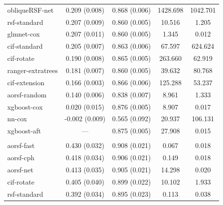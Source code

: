 \documentclass{article}\usepackage[]{graphicx}\usepackage[]{xcolor}
\newenvironment{knitrout}{}{} %
\begin{document}
\begin{knitrout}
\begin{longtable}[t]{lcccc}
\hspace{1em}obliqueRSF-net & 0.209 (0.008) & 0.868 (0.006) & 1428.698 & 1042.701\\
\hspace{1em}rsf-standard & 0.207 (0.009) & 0.860 (0.005) & 10.516 & 1.205\\
\hspace{1em}glmnet-cox & 0.207 (0.011) & 0.860 (0.005) & 1.345 & 0.012\\
\hspace{1em}cif-standard & 0.205 (0.007) & 0.863 (0.006) & 67.597 & 624.624\\
\hspace{1em}cif-rotate & 0.190 (0.008) & 0.865 (0.005) & 263.660 & 62.919\\
\hspace{1em}ranger-extratrees & 0.181 (0.007) & 0.860 (0.005) & 39.632 & 80.768\\
\hspace{1em}cif-extension & 0.166 (0.003) & 0.866 (0.006) & 125.288 & 53.237\\
\hspace{1em}aorsf-random & 0.140 (0.006) & 0.838 (0.007) & 8.961 & 1.333\\
\hspace{1em}xgboost-cox & 0.020 (0.015) & 0.876 (0.005) & 8.907 & 0.017\\
\hspace{1em}nn-cox & -0.002 (0.009) & 0.565 (0.092) & 20.937 & 106.131\\
\hspace{1em}xgboost-aft & --- & 0.875 (0.005) & 27.908 & 0.015\\
\addlinespace[0.3em]
\multicolumn{5}{l}{\textit{\textbf{Primary biliary cholangitis; death, n = 276, p = 19}}}\\
\hline
\hspace{1em}aorsf-fast & 0.430 (0.032) & 0.908 (0.021) & 0.067 & 0.018\\
\hspace{1em}aorsf-cph & 0.418 (0.034) & 0.906 (0.021) & 0.149 & 0.018\\
\hspace{1em}aorsf-net & 0.413 (0.035) & 0.905 (0.021) & 14.298 & 0.020\\
\hspace{1em}cif-rotate & 0.405 (0.040) & 0.899 (0.022) & 10.102 & 1.933\\
\hspace{1em}rsf-standard & 0.392 (0.034) & 0.895 (0.023) & 0.113 & 0.038\\

\end{longtable}
\end{knitrout}
\end{document}
